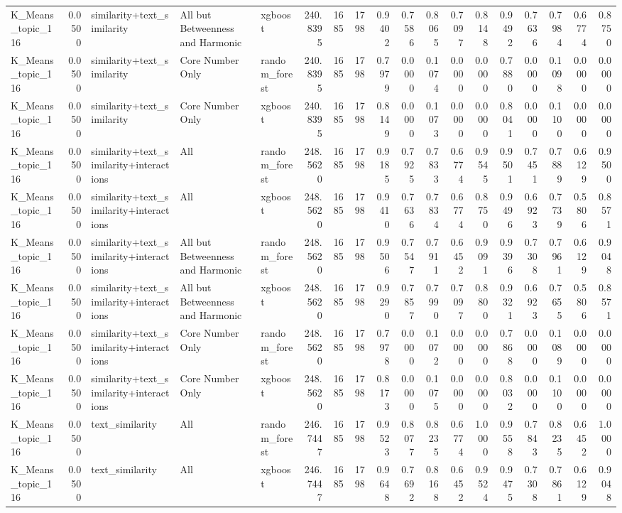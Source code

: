 \begin{tabular}{lrlllrrrrrrrrrrrrr}
K_Means_topic_116 & 0.0500 & similarity+text_similarity & All but Betweenness and Harmonic & xgboost & 240.8395 & 1685 & 1798 & 0.9402 & 0.7586 & 0.8065 & 0.7097 & 0.8148 & 0.9492 & 0.7636 & 0.7984 & 0.6774 & 0.8750 \\
K_Means_topic_116 & 0.0500 & similarity+text_similarity & Core Number Only & random_forest & 240.8395 & 1685 & 1798 & 0.7979 & 0.0000 & 0.1074 & 0.0000 & 0.0000 & 0.7880 & 0.0000 & 0.1098 & 0.0000 & 0.0000 \\
K_Means_topic_116 & 0.0500 & similarity+text_similarity & Core Number Only & xgboost & 240.8395 & 1685 & 1798 & 0.8149 & 0.0000 & 0.1073 & 0.0000 & 0.0000 & 0.8041 & 0.0000 & 0.1100 & 0.0000 & 0.0000 \\
K_Means_topic_116 & 0.0500 & similarity+text_similarity+interactions & All & random_forest & 248.5620 & 1685 & 1798 & 0.9185 & 0.7925 & 0.7833 & 0.6774 & 0.9545 & 0.9501 & 0.7451 & 0.7889 & 0.6129 & 0.9500 \\
K_Means_topic_116 & 0.0500 & similarity+text_similarity+interactions & All & xgboost & 248.5620 & 1685 & 1798 & 0.9410 & 0.7636 & 0.7834 & 0.6774 & 0.8750 & 0.9496 & 0.6923 & 0.7739 & 0.5806 & 0.8571 \\
K_Means_topic_116 & 0.0500 & similarity+text_similarity+interactions & All but Betweenness and Harmonic & random_forest & 248.5620 & 1685 & 1798 & 0.9506 & 0.7547 & 0.7911 & 0.6452 & 0.9091 & 0.9396 & 0.7308 & 0.7961 & 0.6129 & 0.9048 \\
K_Means_topic_116 & 0.0500 & similarity+text_similarity+interactions & All but Betweenness and Harmonic & xgboost & 248.5620 & 1685 & 1798 & 0.9290 & 0.7857 & 0.7990 & 0.7097 & 0.8800 & 0.9321 & 0.6923 & 0.7655 & 0.5806 & 0.8571 \\
K_Means_topic_116 & 0.0500 & similarity+text_similarity+interactions & Core Number Only & random_forest & 248.5620 & 1685 & 1798 & 0.7978 & 0.0000 & 0.1072 & 0.0000 & 0.0000 & 0.7868 & 0.0000 & 0.1089 & 0.0000 & 0.0000 \\
K_Means_topic_116 & 0.0500 & similarity+text_similarity+interactions & Core Number Only & xgboost & 248.5620 & 1685 & 1798 & 0.8173 & 0.0000 & 0.1075 & 0.0000 & 0.0000 & 0.8032 & 0.0000 & 0.1100 & 0.0000 & 0.0000 \\
K_Means_topic_116 & 0.0500 & text_similarity & All & random_forest & 246.7447 & 1685 & 1798 & 0.9523 & 0.8077 & 0.8235 & 0.6774 & 1.0000 & 0.9558 & 0.7843 & 0.8235 & 0.6452 & 1.0000 \\
K_Means_topic_116 & 0.0500 & text_similarity & All & xgboost & 246.7447 & 1685 & 1798 & 0.9648 & 0.7692 & 0.8168 & 0.6452 & 0.9524 & 0.9475 & 0.7308 & 0.7861 & 0.6129 & 0.9048 \\

\end{tabular}
